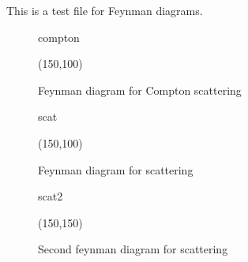 \documentclass[10pt,a4paper]{article}
\begin{document}

This is a test file for Feynman diagrams.

\begin{figure}[t!]
	\centering
	\begin{fmffile}{compton}
	\begin{fmfgraph*}(150,100)


	\end{fmfgraph*}
	\end{fmffile}
	\vspace{5mm}
	\caption{Feynman diagram for Compton scattering} %
	\vspace{5mm}
\end{figure}



\begin{figure}[t!]
	\centering
	\begin{fmffile}{scat}
	\begin{fmfgraph*}(150,100)
	\end{fmfgraph*}
	\end{fmffile}
	\vspace{5mm}
	\caption{Feynman diagram for scattering} %
	\vspace{5mm}
\end{figure}



\begin{figure}[t!]
	\centering
	\begin{fmffile}{scat2}
	\begin{fmfgraph}(150,150)
	\end{fmfgraph}
	\end{fmffile}
	\vspace{5mm}
	\caption{Second feynman diagram for scattering} %
	\vspace{5mm}
\end{figure}
\end{document}
